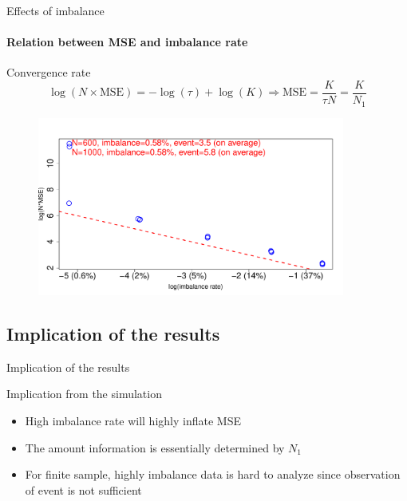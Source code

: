 \documentclass{beamer}
\begin{document}
    \begin{frame}{Effects of imbalance}
    \framesubtitle{Relation between MSE and imbalance rate}
    \begin{block}{Convergence rate}
        \begin{equation*}
            \log(N\times\text{MSE})=-\log(\tau)+\log(K)
            \Rightarrow
            \text{MSE}=\frac{K}{\tau N}=\frac{K}{N_1}
        \end{equation*}
    \end{block}
    \begin{figure}
        \centering
        \includegraphics[width=0.9\textwidth]{log-log.pdf}
        \label{fig:loglog}
    \end{figure}
    \end{frame}
    \subsection{Implication of the results}
    \begin{frame}{Implication of the results}
    \begin{block}{Implication from the simulation}
        \begin{itemize}
            \item High imbalance rate will highly inflate MSE
            \item The amount information is essentially determined by $N_1$
            \item For finite sample, highly imbalance data is hard to analyze since observation of event is not sufficient
        \end{itemize}
    \end{block}
    \end{frame}
\end{document}
